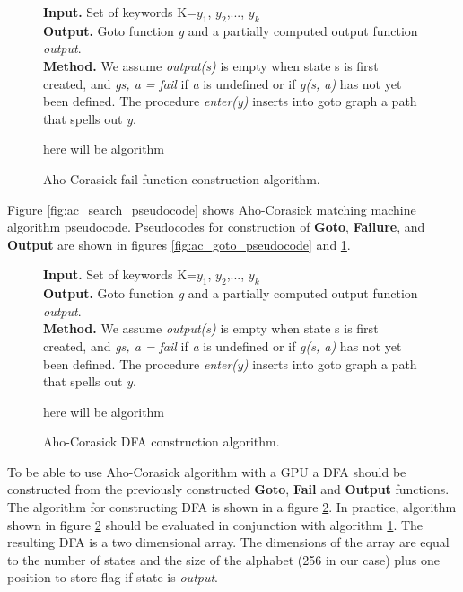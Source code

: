 \documentclass[thesis=M,english]{FITthesis}[2011/07/15]
\begin{document}
\begin{figure}[h]
\textbf{Input.} Set of keywords K={$y_1$, $y_2$,..., $y_k$} \\
\textbf{Output.} Goto function \emph{g} and a partially computed output function \emph{output}.\\
\textbf{Method.} We assume \emph{output(s)} is empty when state s is first created, and \emph{g{s, a} = fail} if \emph{a} is undefined or if \emph{g(s, a)} has not yet been defined. The procedure \emph{enter(y)} inserts into goto graph a path that spells out \emph{y}.
\begin{algorithmic}
\PRINT here will be algorithm
\end{algorithmic}
\caption{Aho-Corasick fail function construction algorithm.}
\label{fig:ac_fail_pseudocode}
\end{figure}

Figure \ref{fig:ac_search_pseudocode} shows Aho-Corasick matching machine algorithm pseudocode. Pseudocodes for construction of \textbf{Goto}, \textbf{Failure}, and \textbf{Output} are shown in figures \ref{fig:ac_goto_pseudocode} and \ref{fig:ac_fail_pseudocode}.

\begin{figure}[h]
\textbf{Input.} Set of keywords K={$y_1$, $y_2$,..., $y_k$} \\
\textbf{Output.} Goto function \emph{g} and a partially computed output function \emph{output}.\\
\textbf{Method.} We assume \emph{output(s)} is empty when state s is first created, and \emph{g{s, a} = fail} if \emph{a} is undefined or if \emph{g(s, a)} has not yet been defined. The procedure \emph{enter(y)} inserts into goto graph a path that spells out \emph{y}.
\begin{algorithmic}
\PRINT here will be algorithm
\end{algorithmic}
\caption{Aho-Corasick DFA construction algorithm.}
\label{fig:ac_dfa_pseudocode}
\end{figure}

To be able to use Aho-Corasick algorithm with a GPU a DFA should be constructed from the previously constructed \textbf{Goto}, \textbf{Fail} and \textbf{Output} functions. The algorithm for constructing DFA is shown in a figure \ref{fig:ac_dfa_pseudocode}. In practice, algorithm shown in figure \ref{fig:ac_dfa_pseudocode} should be evaluated in conjunction with algorithm \ref{fig:ac_fail_pseudocode}. The resulting DFA is a two dimensional array. The dimensions of the array are equal to the number of states and the size of the alphabet (256 in our case) plus one position to store flag if state is \emph{output}.
\end{document}
